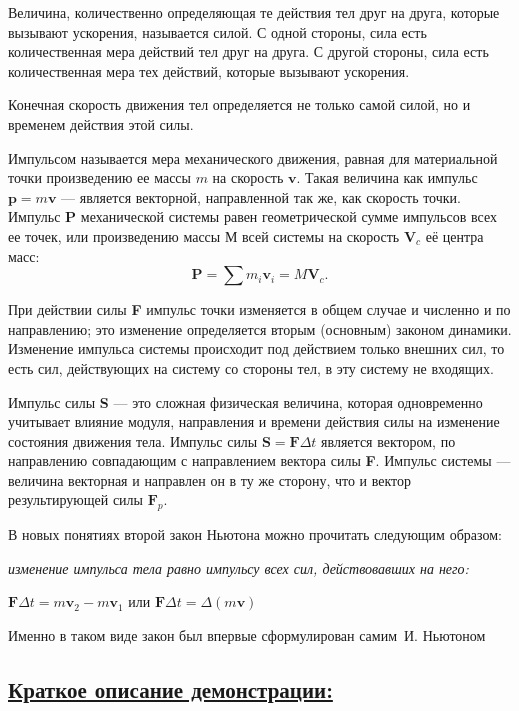 \documentclass[14pt,a4paper,oneside]{extarticle}	%
\begin{document}
Величина, количественно определяющая те действия тел друг 
на друга, которые вызывают ускорения, называется силой. 
С одной стороны, сила есть количественная мера действий тел друг на друга.
С другой стороны, сила есть количественная мера тех действий, которые вызывают ускорения.  

Конечная скорость движения тел определяется не только самой 
силой, но и временем действия этой силы. 

Импульсом называется мера механического движения, равная для материальной точки произведению ее массы $ m $ на скорость $ \textbf{v} $.
Такая величина как импульс $ \textbf{p} = m\textbf{v} $ — является векторной, направленной так же, как скорость точки.
Импульс $ \textbf{P} $ механической системы равен геометрической сумме импульсов всех ее точек, или произведению массы $ М $ всей системы на скорость $ \textbf{V}_{c} $ её центра масс: $$ \textbf{P} = \sum m_{i} \textbf{v}_{i} =  M\textbf{V}_{c}. $$

При действии силы \textbf{F} импульс точки изменяется в общем случае и численно и по направлению; это изменение определяется вторым (основным) законом динамики.
Изменение импульса системы происходит под действием только внешних сил, то есть сил, действующих на систему со стороны тел, в эту систему не входящих.

Импульс силы \textbf{S} — это сложная физическая величина, которая 
одновременно учитывает влияние модуля, направления и времени 
действия силы на изменение состояния движения тела.
Импульс силы $\textbf{S} = \textbf{F}\Delta t $ является вектором, по направлению совпадающим с направлением вектора силы \textbf{F}. 
Импульс системы — величина векторная и направлен он в ту же сторону, что и вектор результирующей силы $ \textbf{F}_{p} $.

В новых понятиях второй закон Ньютона можно прочитать следующим образом: 
\begin{flushleft}
	\textit{изменение импульса тела равно импульсу всех сил, действовавших на него:}
\end{flushleft}

\begin{center}
		$\textbf{F}\Delta t = m\textbf{v}_{2} - m\textbf{v}_{1} $ или $\textbf{F}\Delta t = \Delta(m\textbf{v}) $
\end{center}

Именно в таком виде закон был впервые сформулирован самим И. Ньютоном 

\newpage
\subsection*{\underline{Краткое описание демонстрации:}}
\end{document}
